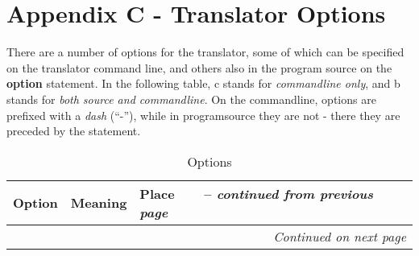 \chapter{Appendix C - Translator Options}\label{optionstable}

There are a number of options for the translator, some of which can be
specified on the translator command line, and others also in the
program source on the \textbf{option} statement. In the following
table, c stands for \emph{commandline only}, and b stands for
\emph{both source and commandline}. On the commandline,
options are prefixed with a \emph{dash} (``-''), while in
programsource they are not - there they are preceded by the
 statement.
\begin{longtable}[l]{|l|p{10cm}|l|}
\caption{ Options } \\
\hline
\rowcolor[gray]{0.8} \bfseries Option & \bfseries Meaning & \bfseries Place   \
\endfirsthead
\multicolumn{3}{r}%
{{\tablename\ \thetable{} -- \emph{continued from previous page}}} \\
\endhead
\hline \multicolumn{3}{r}{\emph{Continued on next page}}
\endfoot


\end{longtable}
